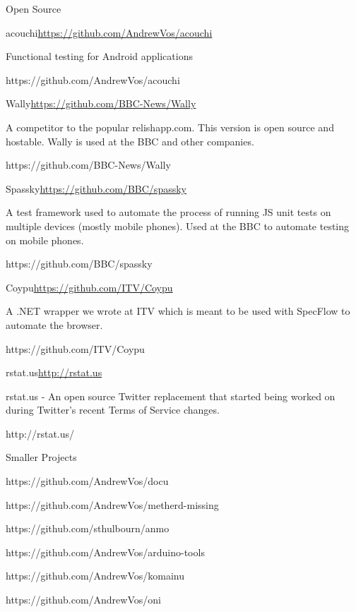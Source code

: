 \documentclass{resume}
\begin{document}
  \begin{rSection}{Open Source}
    \begin{rSubsection}{acouchi}{\url{https://github.com/AndrewVos/acouchi}}{}{}
      \item Functional testing for Android applications
      \item https://github.com/AndrewVos/acouchi
    \end{rSubsection}

    \begin{rSubsection}{Wally}{\url{https://github.com/BBC-News/Wally}}{}{}
      \item A competitor to the popular relishapp.com. This version is open source and hostable. Wally is used at the BBC and other companies.
      \item https://github.com/BBC-News/Wally
    \end{rSubsection}

    \begin{rSubsection}{Spassky}{\url{https://github.com/BBC/spassky}}{}{}
      \item A test framework used to automate the process of running JS unit tests on multiple devices (mostly mobile phones). Used at the BBC to automate testing on mobile phones.
      \item https://github.com/BBC/spassky
    \end{rSubsection}

    \begin{rSubsection}{Coypu}{\url{https://github.com/ITV/Coypu}}{}{}
      \item A .NET wrapper we wrote at ITV which is meant to be used with SpecFlow to automate the browser.
      \item https://github.com/ITV/Coypu
    \end{rSubsection}

    \begin{rSubsection}{rstat.us}{\url{http://rstat.us}}{}{}
      \item rstat.us - An open source Twitter replacement that started being worked on during Twitter’s recent Terms of Service changes.
      \item http://rstat.us/
    \end{rSubsection}
  \end{rSection}

  \begin{rSection}{Smaller Projects}
    \item https://github.com/AndrewVos/docu
    \item https://github.com/AndrewVos/metherd-missing
    \item https://github.com/sthulbourn/anmo
    \item https://github.com/AndrewVos/arduino-tools
    \item https://github.com/AndrewVos/komainu
    \item https://github.com/AndrewVos/oni
  \end{rSection}
\end{document}
